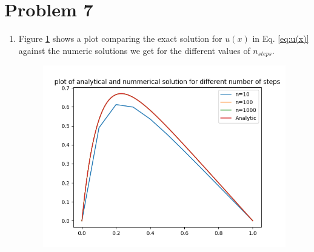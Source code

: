 \documentclass[english,notitlepage]{revtex4-1}  %
\begin{document}
\section*{Problem 7}
\begin{enumerate}[label= b)]
  \item Figure \ref{fig:analytical_compare} shows a plot comparing the exact solution for $u(x)$  in Eq. \ref{eq:u(x)} against the numeric solutions we get for the different values of $n_{steps}$.
  \begin{figure}[H]
    \centering
    \includegraphics[width=.7\textwidth]{../figures/analytical_compare.png}
    \caption{}
    \label{fig:analytical_compare}
  \end{figure}
\end{enumerate}
\end{document}
